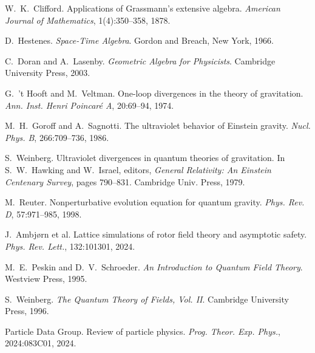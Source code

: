 \documentclass[11pt,a4paper]{article}
\numberwithin{equation}{section}
\theoremstyle{plain}
\theoremstyle{definition}
\theoremstyle{remark}
\begin{document}
\begin{thebibliography}{99}

W.~K.~Clifford.
\newblock Applications of Grassmann's extensive algebra.
\newblock \emph{American Journal of Mathematics}, 1(4):350--358, 1878.

D.~Hestenes.
\newblock \emph{Space-Time Algebra}.
\newblock Gordon and Breach, New York, 1966.

C.~Doran and A.~Lasenby.
\newblock \emph{Geometric Algebra for Physicists}.
\newblock Cambridge University Press, 2003.

G.~'t Hooft and M.~Veltman.
\newblock One-loop divergences in the theory of gravitation.
\newblock \emph{Ann. Inst. Henri Poincar\'e A}, 20:69--94, 1974.

M.~H.~Goroff and A.~Sagnotti.
\newblock The ultraviolet behavior of Einstein gravity.
\newblock \emph{Nucl. Phys. B}, 266:709--736, 1986.

S.~Weinberg.
\newblock Ultraviolet divergences in quantum theories of gravitation.
\newblock In S.~W.~Hawking and W.~Israel, editors, \emph{General Relativity: An Einstein Centenary Survey}, pages 790--831. Cambridge Univ. Press, 1979.

M.~Reuter.
\newblock Nonperturbative evolution equation for quantum gravity.
\newblock \emph{Phys. Rev. D}, 57:971--985, 1998.

J.~Ambj{\o}rn et al.
\newblock Lattice simulations of rotor field theory and asymptotic safety.
\newblock \emph{Phys. Rev. Lett.}, 132:101301, 2024.

M.~E.~Peskin and D.~V.~Schroeder.
\newblock \emph{An Introduction to Quantum Field Theory}.
\newblock Westview Press, 1995.

S.~Weinberg.
\newblock \emph{The Quantum Theory of Fields, Vol. II}.
\newblock Cambridge University Press, 1996.

Particle Data Group.
\newblock Review of particle physics.
\newblock \emph{Prog. Theor. Exp. Phys.}, 2024:083C01, 2024.

\end{thebibliography}
\end{document}
